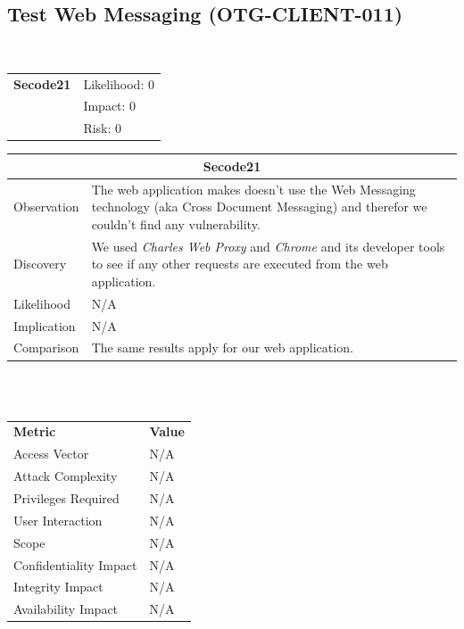 \documentclass[headsepline,footsepline,footinclude=false,oneside,fontsize=11pt,paper=a4,listof=totoc,bibliography=totoc]{scrbook} %
\begin{document}
\subsection{Test Web Messaging (OTG-CLIENT-011)}\
\begin{tabular}{cR{12cm}}
	\textbf{Secode21} & Likelihood: 0\\& Impact: 0\\& Risk: 0
\end{tabular}

\begin{tabular}{ l|p{11cm}  }
	\hline
	\multicolumn{2}{c}{\textbf{Secode21}} \\
	\hline
	Observation   & The web application makes doesn't use the Web Messaging technology (aka Cross Document Messaging) and therefor we couldn't find any vulnerability. \\
	Discovery  & We used \textit{Charles Web Proxy} and \textit{Chrome} and its developer tools to see if any other requests are executed from the web application. \\
	Likelihood & N/A \\
	Implication    & N/A \\
	Comparison & The same results apply for our web application.  \\
	\hline
\end{tabular}
\\
\vspace{0.5cm}
\\
\begin{center}
	\begin{tabular}{ll}
		\rowcolor[HTML]{34CDF9}
		{\color[HTML]{ECF4FF} \textbf{Metric}}        & {\color[HTML]{ECF4FF} \textbf{Value}} \\
		\rowcolor[HTML]{BBDAFF}
		{\color[HTML]{333333} Access Vector}          & {\color[HTML]{333333} } N/A              \\
		\rowcolor[HTML]{ECF4FF}
		{\color[HTML]{333333} Attack Complexity}      & {\color[HTML]{333333} } N/A              \\
		\rowcolor[HTML]{BBDAFF}
		{\color[HTML]{333333} Privileges Required}    & {\color[HTML]{333333} } N/A              \\
		\rowcolor[HTML]{ECF4FF}
		{\color[HTML]{333333} User Interaction}       & {\color[HTML]{333333} } N/A              \\
		\rowcolor[HTML]{BBDAFF}
		{\color[HTML]{333333} Scope}                  & {\color[HTML]{333333} } N/A              \\
		\rowcolor[HTML]{ECF4FF}
		{\color[HTML]{333333} Confidentiality Impact} & {\color[HTML]{333333} } N/A              \\
		\rowcolor[HTML]{BBDAFF}
		{\color[HTML]{333333} Integrity Impact}       & {\color[HTML]{333333} } N/A              \\
		\rowcolor[HTML]{ECF4FF}
		{\color[HTML]{333333} Availability Impact}    & {\color[HTML]{333333} } N/A
	\end{tabular}
\end{center}
\pagebreak
\end{document}
